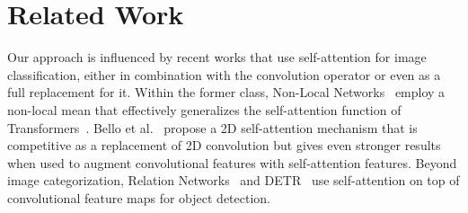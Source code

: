\documentclass{article}
\begin{document}









\section{Related Work}


Our approach is influenced by recent works that use self-attention for image classification, either in combination with the convolution operator or even as a full replacement for it. Within the former class, Non-Local Networks~\cite{NLN} employ a non-local mean that effectively generalizes the self-attention function of Transformers~\cite{Vaswani:2017}. Bello et al.~\cite{BelloEtAl} propose a 2D self-attention mechanism that is competitive as a replacement of 2D convolution but gives even stronger results when used to augment convolutional features with self-attention features. Beyond image categorization, Relation Networks~\cite{Hu:CVPR2018} and DETR~\cite{DETR} use self-attention on top of convolutional feature maps for object detection. 
\end{document}
